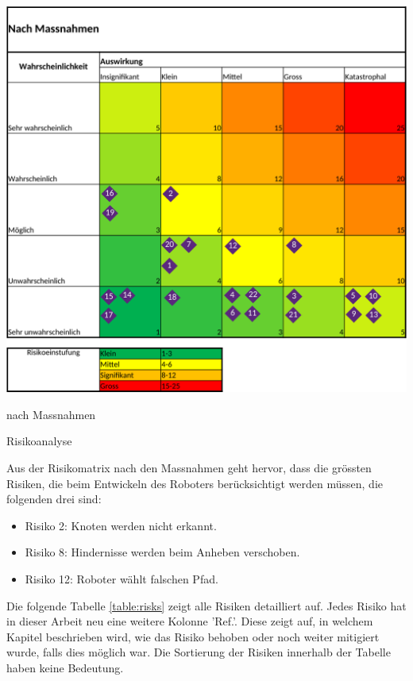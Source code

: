 \begin{table}[H]
\begin{subtable}{0.49\textwidth}
\includegraphics[width=0.99\linewidth]{assets/projektmanagement/Risikoanalyse_nachher-crop.pdf}
\caption{nach Massnahmen}
\label{table:risk-after}
\end{subtable}
\caption{Risikoanalyse}
\label{table:risk-table}
\end{table}

Aus der Risikomatrix nach den Massnahmen geht hervor, dass die grössten Risiken, die beim Entwickeln des Roboters berücksichtigt werden müssen, die folgenden drei sind:

\begin{itemize}
    \item Risiko 2: Knoten werden nicht erkannt.
    \item Risiko 8: Hindernisse werden beim Anheben verschoben.
    \item Risiko 12: Roboter wählt falschen Pfad.
\end{itemize}

Die folgende Tabelle \ref{table:risks} zeigt alle Risiken detailliert auf.  Jedes Risiko hat in dieser Arbeit neu eine weitere Kolonne 'Ref.'. Diese zeigt auf, in welchem Kapitel beschrieben wird, wie das Risiko behoben oder noch weiter mitigiert wurde, falls dies möglich war. Die Sortierung der Risiken innerhalb der Tabelle haben keine Bedeutung.

